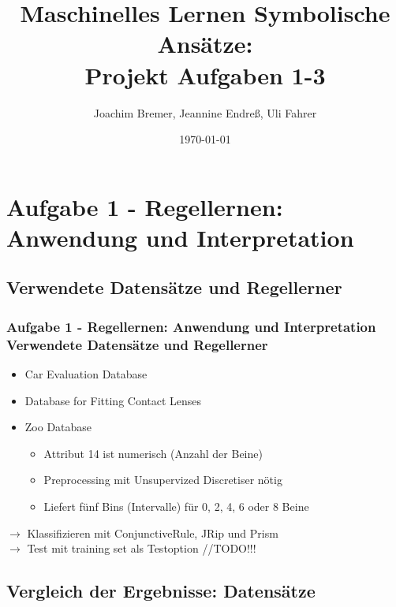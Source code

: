 \documentclass[accentcolor=tud6b,colorbacktitle,inverttitle,landscape,german,presentation,t]{tudbeamer}
\begin{document}
\title[MLDM: Projekt Aufgabe 1-3]{Maschinelles Lernen Symbolische Ansätze:\\ Projekt Aufgaben 1-3}
\subtitle{}

\author[bremer\_endreß\_fahrer]{Joachim Bremer, Jeannine Endreß, Uli Fahrer}

\date{\today}

\begin{titleframe}
\tableofcontents
\end{titleframe}

    \section{Aufgabe 1 - Regellernen: Anwendung und Interpretation}
    
    \subsection{Verwendete Datensätze und Regellerner}
    
    \begin{frame}[t]
    \frametitle{Aufgabe 1 - Regellernen: Anwendung und Interpretation\\ Verwendete Datensätze und Regellerner}
        \begin{itemize}
            \item Car Evaluation Database
            \item Database for Fitting Contact Lenses
            \item Zoo Database
            \begin{itemize}
                \item Attribut 14 ist numerisch (Anzahl der Beine)
                \item Preprocessing mit Unsupervized Discretiser nötig
                \item Liefert fünf Bins (Intervalle) für 0, 2, 4, 6 oder 8 Beine
            \end{itemize}
        \end{itemize}
        \vfill
        $\rightarrow$ Klassifizieren mit ConjunctiveRule, JRip und Prism\\
        $\rightarrow$ Test mit training set als Testoption //TODO!!!
    \end{frame}
    
    \subsection{Vergleich der Ergebnisse: Datensätze}
    
\end{document}
